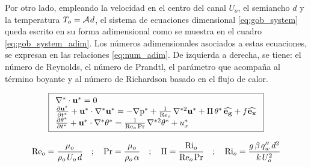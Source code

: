 Por otro lado, empleando la velocidad en el centro del canal $U_o$, el semiancho $d$ y la temperatura $T_o = \mathcal{A} \hspace{0.3mm} d $, el sistema de ecuaciones dimensional \ref{eq:gob_system} queda escrito en su forma adimensional como se muestra en el cuadro \ref{eq:gob_system_adim}. Los números adimensionales asociados a estas ecuaciones, se expresan en las relaciones \ref{eq:num_adim}. De izquierda a derecha, se tiene: el número de Reynolds, el número de Prandtl, el parámetro que acompaña al término boyante y al número de Richardson basado en el flujo de calor. 



\begin{equation}
\boxed{
\begin{array}{l}
    \nabla^* \cdot \mathbf{u^*} = 0 \\
    \frac{\partial \mathbf{u^*}}{\partial t^*} + \mathbf{u^*} \cdot \nabla^* \mathbf{u^*} = 
    -\nabla \text{p}^* + \frac{1}{\text{Re}_o} \hspace{0.5mm} \nabla^{*2} \mathbf{u^*} + \Pi \hspace{0.5mm} \theta^* \hspace{0.5mm} \mathbf{\widehat{e_g}} + f \mathbf{\widehat{e_x}}  \\
    \frac{\partial \theta^*}{\partial t^*} + \mathbf{u^*} \cdot \nabla^* \theta^* = 
    \frac{1}{\text{Re}_o \hspace{0.5mm} \text{Pr}} \hspace{0.5mm} \nabla^{*2} \theta^* + u_x^* 
\end{array}
}
\label{eq:gob_system_adim}
\end{equation}

\begin{equation}
\text{Re}_o = \frac{\mu_o}{\rho_o \hspace{0.5mm} U_o \hspace{0.5mm} d } \quad ; \quad \text{Pr}= \frac{\mu_o}{\rho_o \hspace{0.5mm} \alpha} \quad ; \quad \Pi = \frac{\text{Ri}_o}{\text{Re}_o \hspace{0.5mm} \text{Pr}} \quad ; \quad \text{Ri}_o = \frac{g \hspace{0.5mm} \beta \hspace{0.5mm} q''_w \hspace{0.5mm} d^2}{k \hspace{0.5mm} U_o^2}
\label{eq:num_adim}
\end{equation}

